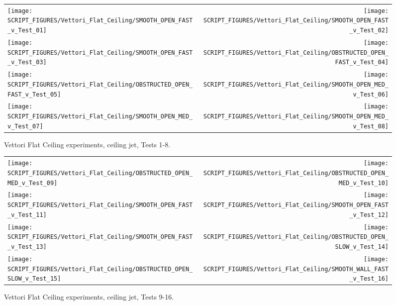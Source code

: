 \begin{figure}[p]
\begin{tabular*}{\textwidth}{l@{\extracolsep{\fill}}r}
\texttt{[image: SCRIPT\_FIGURES/Vettori\_Flat\_Ceiling/SMOOTH\_OPEN\_FAST\_v\_Test\_01]} &
\texttt{[image: SCRIPT\_FIGURES/Vettori\_Flat\_Ceiling/SMOOTH\_OPEN\_FAST\_v\_Test\_02]} \\
\texttt{[image: SCRIPT\_FIGURES/Vettori\_Flat\_Ceiling/SMOOTH\_OPEN\_FAST\_v\_Test\_03]} &
\texttt{[image: SCRIPT\_FIGURES/Vettori\_Flat\_Ceiling/OBSTRUCTED\_OPEN\_FAST\_v\_Test\_04]} \\
\texttt{[image: SCRIPT\_FIGURES/Vettori\_Flat\_Ceiling/OBSTRUCTED\_OPEN\_FAST\_v\_Test\_05]} &
\texttt{[image: SCRIPT\_FIGURES/Vettori\_Flat\_Ceiling/SMOOTH\_OPEN\_MED\_v\_Test\_06]} \\
\texttt{[image: SCRIPT\_FIGURES/Vettori\_Flat\_Ceiling/SMOOTH\_OPEN\_MED\_v\_Test\_07]} &
\texttt{[image: SCRIPT\_FIGURES/Vettori\_Flat\_Ceiling/SMOOTH\_OPEN\_MED\_v\_Test\_08]} \\
\end{tabular*}
\caption{Vettori Flat Ceiling experiments, ceiling jet, Tests 1-8.}
\label{Vettori_1}
\end{figure}

\begin{figure}[p]
\begin{tabular*}{\textwidth}{l@{\extracolsep{\fill}}r}
\texttt{[image: SCRIPT\_FIGURES/Vettori\_Flat\_Ceiling/OBSTRUCTED\_OPEN\_MED\_v\_Test\_09]} &
\texttt{[image: SCRIPT\_FIGURES/Vettori\_Flat\_Ceiling/OBSTRUCTED\_OPEN\_MED\_v\_Test\_10]} \\
\texttt{[image: SCRIPT\_FIGURES/Vettori\_Flat\_Ceiling/SMOOTH\_OPEN\_FAST\_v\_Test\_11]} &
\texttt{[image: SCRIPT\_FIGURES/Vettori\_Flat\_Ceiling/SMOOTH\_OPEN\_FAST\_v\_Test\_12]} \\
\texttt{[image: SCRIPT\_FIGURES/Vettori\_Flat\_Ceiling/SMOOTH\_OPEN\_FAST\_v\_Test\_13]} &
\texttt{[image: SCRIPT\_FIGURES/Vettori\_Flat\_Ceiling/OBSTRUCTED\_OPEN\_SLOW\_v\_Test\_14]} \\
\texttt{[image: SCRIPT\_FIGURES/Vettori\_Flat\_Ceiling/OBSTRUCTED\_OPEN\_SLOW\_v\_Test\_15]} &
\texttt{[image: SCRIPT\_FIGURES/Vettori\_Flat\_Ceiling/SMOOTH\_WALL\_FAST\_v\_Test\_16]} \\
\end{tabular*}
\caption{Vettori Flat Ceiling experiments, ceiling jet, Tests 9-16.}
\label{Vettori_2}
\end{figure}

